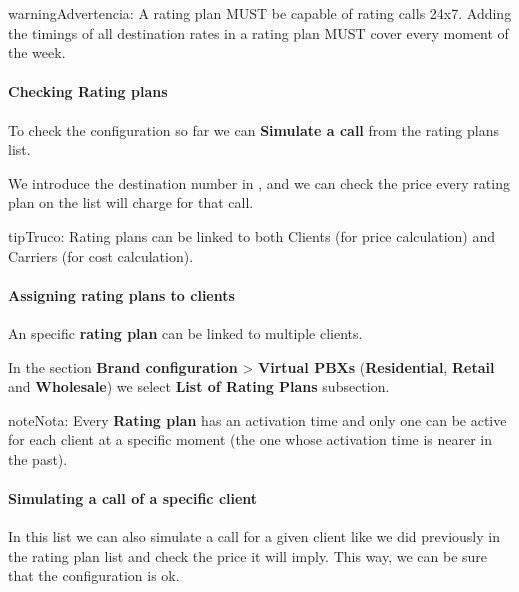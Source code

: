 \documentclass[letterpaper,10pt,spanish]{sphinxmanual}
\begin{document}
\begin{notice}{warning}{Advertencia:}
A rating plan MUST be capable of rating calls 24x7. Adding the timings of all destination rates in a rating
plan MUST cover every moment of the week.
\end{notice}
\paragraph{Checking Rating plans}

To check the configuration so far we can \textbf{Simulate a call} from the rating plans list.

We introduce the destination number in {\hyperref[administration_portal/brand/settings/numeric_transformations:e164]{}}, and we can check the price every rating plan on the
list will charge for that call.

\begin{notice}{tip}{Truco:}
Rating plans can be linked to both Clients (for price calculation) and Carriers (for cost calculation).
\end{notice}


\paragraph{Assigning rating plans to clients}
\label{administration_portal/brand/billing/rating_plans:id2}\label{administration_portal/brand/billing/rating_plans:assigning-rating-plans-to-clients}
An specific \textbf{rating plan} can be linked to multiple clients.

In the section \textbf{Brand configuration} \textgreater{} \textbf{Virtual PBXs} (\textbf{Residential}, \textbf{Retail} and \textbf{Wholesale}) we select
\textbf{List of Rating Plans} subsection.

\begin{notice}{note}{Nota:}
Every \textbf{Rating plan} has an activation time and only one can be active for each
client at a specific moment (the one whose activation time is nearer in the past).
\end{notice}
\paragraph{Simulating a call of a specific client}

In this list we can also simulate a call for a given client like we did previously
in the rating plan list and check the price it will imply. This way, we can be sure
that the configuration is ok.
\end{document}
